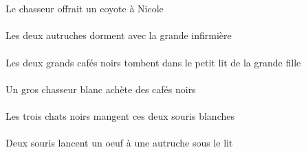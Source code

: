 \begin{exe}
\ex\gll
\DEFSgErg{}   \chasseurCSgErg{}    \INDSgDat{}   \NicoleDSgDat{}   \INDSgAbs{}   \coyoteASgAbs{}  \offrirVdPstASg{}\\
\DEFSgErgP{}   \chasseurCSgErgP{}    \INDSgDatP{}   \NicoleDSgDatP{}   \INDSgAbsP{}   \coyoteASgAbsP{}  \offrirVdPstASgP{}\\
Le chasseur offrait un coyote à Nicole
\ex\gll
\DEFDuAbs{}   \autrucheDDuAbs{}    \DEFSgObl{}   \grandBSg{}   \infirmiereBSgObl{}   \AVEC{}  \dormirViPrsDDu{}\\
\DEFDuAbsP{}   \autrucheDDuAbsP{}    \DEFSgOblP{}   \grandBSgP{}   \infirmiereBSgOblP{}   \AVECP{}  \dormirViPrsDDuP{}\\
Les deux autruches dorment avec la grande infirmière
\ex\gll
\DEFDuAbs{}   \grandDDu{}   \noirDDu{}   \cafeDDuAbs{}    \DEFSgObl{}    \DEFSgObl{}   \grandCSg{}   \filleCSgObl{}   \DE{}   \petitDSg{}   \litDSgObl{}   \DANS{}  \tomberViPrsDDu{}\\
\DEFDuAbsP{}   \grandDDuP{}   \noirDDuP{}   \cafeDDuAbsP{}    \DEFSgOblP{}    \DEFSgOblP{}   \grandCSgP{}   \filleCSgOblP{}   \DEP{}   \petitDSgP{}   \litDSgOblP{}   \DANSP{}  \tomberViPrsDDuP{}\\
Les deux grands cafés noirs tombent dans le petit lit de la grande fille
\ex\gll
\INDSgErg{}   \grosCSg{}   \blancCSg{}   \chasseurCSgErg{}   \INDPlAbs{}   \noirDPl{}   \cafeDPlAbs{}  \acheterVtPrsDPl{}\\
\INDSgErgP{}   \grosCSgP{}   \blancCSgP{}   \chasseurCSgErgP{}   \INDPlAbsP{}   \noirDPlP{}   \cafeDPlAbsP{}  \acheterVtPrsDPlP{}\\
Un gros chasseur blanc achète des cafés noirs
\ex\gll
\DEFPlErg{}   \troisDPl{}   \noirDPl{}   \chatDPlErg{}   \DEMDuAbs{}   \blancADu{}   \sourisADuAbs{}  \mangerVtPrsADu{}\\
\DEFPlErgP{}   \troisDPlP{}   \noirDPlP{}   \chatDPlErgP{}   \DEMDuAbsP{}   \blancADuP{}   \sourisADuAbsP{}  \mangerVtPrsADuP{}\\
Les trois chats noirs mangent ces deux souris blanches
\ex\gll
\DEFSgObl{}   \litDSgObl{}   \SOUS{}   \INDDuErg{}   \sourisADuErg{}    \INDSgDat{}   \autrucheDSgDat{}   \INDSgAbs{}   \oeufDSgAbs{}  \lancerVdPrsDSg{}\\
\DEFSgOblP{}   \litDSgOblP{}   \SOUSP{}   \INDDuErgP{}   \sourisADuErgP{}    \INDSgDatP{}   \autrucheDSgDatP{}   \INDSgAbsP{}   \oeufDSgAbsP{}  \lancerVdPrsDSgP{}\\
Deux souris lancent un oeuf à une autruche sous le lit
\ex\gll
\DEFSgErg{}   \litDSgErg{}   \INDDuAbs{}   \grosDDu{}   \blancDDu{}   \chatDDuAbs{}  \supporterVtPstDDu{}\\

\end{exe}
